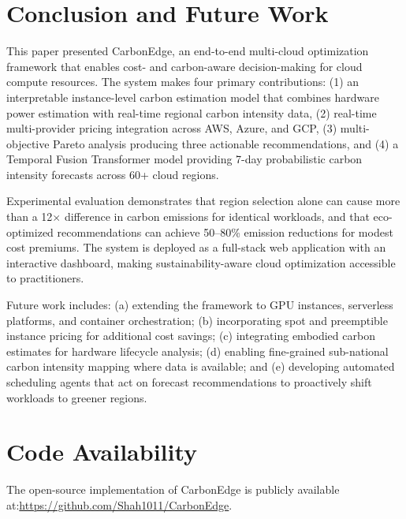 \documentclass[conference]{IEEEtran}
\begin{document}
\section{Conclusion and Future Work}

This paper presented CarbonEdge, an end-to-end multi-cloud optimization framework that enables cost- and carbon-aware decision-making for cloud compute resources. The system makes four primary contributions: (1) an interpretable instance-level carbon estimation model that combines hardware power estimation with real-time regional carbon intensity data, (2) real-time multi-provider pricing integration across AWS, Azure, and GCP, (3) multi-objective Pareto analysis producing three actionable recommendations, and (4) a Temporal Fusion Transformer model providing 7-day probabilistic carbon intensity forecasts across 60+ cloud regions.

Experimental evaluation demonstrates that region selection alone can cause more than a 12$\times$ difference in carbon emissions for identical workloads, and that eco-optimized recommendations can achieve 50--80\% emission reductions for modest cost premiums. The system is deployed as a full-stack web application with an interactive dashboard, making sustainability-aware cloud optimization accessible to practitioners.

Future work includes: (a) extending the framework to GPU instances, serverless platforms, and container orchestration; (b) incorporating spot and preemptible instance pricing for additional cost savings; (c) integrating embodied carbon estimates for hardware lifecycle analysis; (d) enabling fine-grained sub-national carbon intensity mapping where data is available; and (e) developing automated scheduling agents that act on forecast recommendations to proactively shift workloads to greener regions.

\section*{Code Availability}

The open-source implementation of CarbonEdge is publicly available at:\url{https://github.com/Shah1011/CarbonEdge}.
\end{document}
